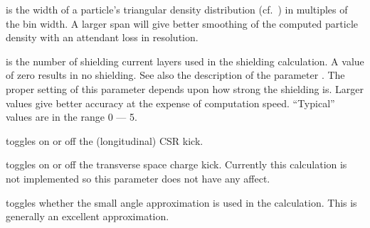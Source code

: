  is the width of a particle's triangular density
distribution (cf.~) in multiples of the bin width. A
larger span will give better smoothing of the computed particle
density with an attendant loss in resolution.

 is the number of shielding current layers used in
the shielding calculation. A value of zero results in no
shielding. See also the description of the parameter
. The proper setting of this parameter depends
upon how strong the shielding is. Larger values give better accuracy
at the expense of computation speed. ``Typical'' values are in the
range 0 --- 5.

 toggles on or off the (longitudinal) CSR kick.

 toggles on or off the transverse space charge
kick. Currently this calculation is not implemented so this parameter
does not have any affect.

 toggles whether the small angle approximation
is used in the calculation. This is generally an excellent
approximation.


